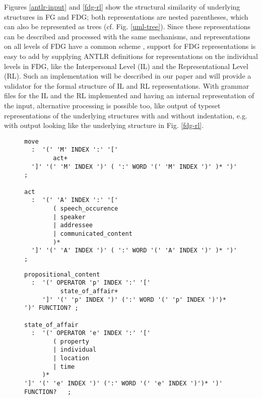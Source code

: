 \documentclass[a4paper, halfparskip, onecolumn, abstracton, final, figurecaptionabove]{scrartcl}
\begin{document}
Figures \ref{antlr-input} and \ref{fdg-rl} show the structural similarity of underlying structures in FG and FDG; both representations are nested parentheses, which can also be represented as trees (cf. Fig. \ref{uml-tree}). Since these representations can be described and processed with the same mechanisms, and representations on all levels of FDG have a common scheme \citep[671]{HengeveldAndMackenzie2006}, support for FDG representations is easy to add by supplying ANTLR definitions for representations on the individual levels in FDG, like the Interpersonal Level (IL) and the Representational Level (RL). Such an implementation will be described in our paper and will provide a validator for the formal structure of IL and RL representations. With grammar files for the IL and the RL implemented and having an internal representation of the input, alternative processing is possible too, like output of typeset representations of the underlying structures with and without indentation, e.g. with output looking like the underlying structure in Fig. \ref{fdg-rl}.

\begin{figure}

\begin{verbatim}
move
  :  '(' 'M' INDEX ':' '['
        act+
  ']' '(' 'M' INDEX ')' ( ':' WORD '(' 'M' INDEX ')' )* ')' ;
			
act
  :  '(' 'A' INDEX ':' '['
        ( speech_occurence
        | speaker
        | addressee
        | communicated_content
        )*
  ']' '(' 'A' INDEX ')' ( ':' WORD '(' 'A' INDEX ')' )* ')' ;
\end{verbatim}

 \label{antlr-def1}
\end{figure}

\begin{figure}
\begin{center}
\end{center}
 \label{antlr-il}
\end{figure}

\begin{figure}

\begin{verbatim}
propositional_content
  :  '(' OPERATOR 'p' INDEX ':' '[' 
          state_of_affair+ 
     ']' '(' 'p' INDEX ')' (':' WORD '(' 'p' INDEX ')')* ')' FUNCTION? ;

state_of_affair 	
  :  '(' OPERATOR 'e' INDEX ':' '[' 
        ( property 
        | individual 
        | location 
        | time
     )* 
']' '(' 'e' INDEX ')' (':' WORD '(' 'e' INDEX ')')* ')' FUNCTION?	;
\end{verbatim}

 \label{antlr-def2}
\end{figure}
\end{document}
